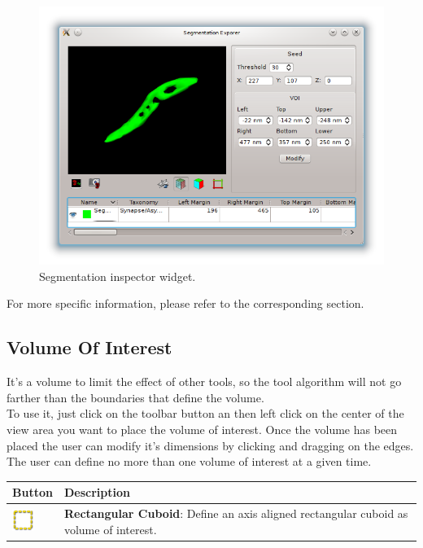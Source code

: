 \begin{figure}[H]
\centering
\includegraphics[width=\linewidth]{fig/SegmentationInspector}
\caption{Segmentation inspector widget.}
\end{figure}

For more specific information, please refer to the corresponding section.

\subsection{Volume Of Interest}

It's a volume to limit the effect of other tools, so the tool algorithm will not
go farther than the boundaries that define the volume.\\
To use it, just click on the toolbar button an then left click on the center of
the view area you want to place the volume of interest. Once the volume has been
placed the user can modify it's dimensions by clicking and dragging on the edges.\\
The user can define no more than one volume of interest at a given time. 

\vspace{0.3cm}
\begin{tabular}{| m{1.3cm} | m{12cm} |}
\hline
\textbf{Button} & \textbf{Description}\\
\hline
\includegraphics[width=0.7cm]{../../frontend/toolbar/voi/rsc/roi} &
\textbf{Rectangular Cuboid}: Define an axis aligned rectangular cuboid as volume
of interest.\\
\hline
\end{tabular}


